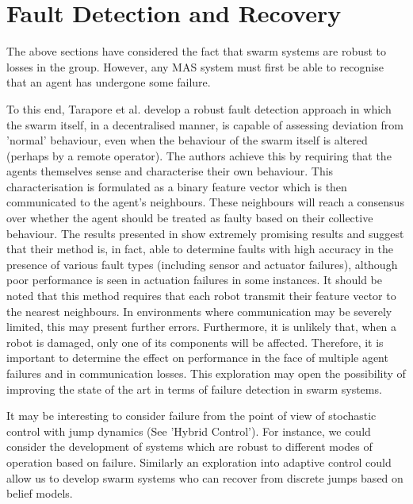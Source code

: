 \documentclass[../sample.tex]{subfiles}
\begin{document}
\section{Fault Detection and Recovery}


The above sections have considered the fact that swarm systems are robust to losses in the group. 
However, any MAS system must first be able to recognise that an agent has undergone some failure.

To this end, Tarapore et al. \cite{Tarapore2019FaultDetection} develop a robust fault detection
approach in which the swarm itself, in a decentralised manner, is capable of assessing deviation
from 'normal' behaviour, even when the behaviour of the swarm itself is altered (perhaps by a remote
operator). The authors achieve this by requiring that the agents themselves sense and characterise
their own behaviour. This characterisation is formulated as a binary feature vector which is then
communicated to the agent's neighbours. These neighbours will reach a consensus over whether the
agent should be treated as faulty based on their collective behaviour. The results presented in
\cite{Tarapore2019FaultDetection} show extremely promising results and suggest that their method is,
in fact, able to determine faults with high accuracy in the presence of various fault types
(including sensor and actuator failures), although poor performance is seen in actuation failures in
some instances. It should be noted that this method requires that each robot transmit their feature
vector to the nearest neighbours. In environments where communication may be severely limited, this
may present further errors. Furthermore, it is unlikely that, when a robot is damaged, only one of
its components will be affected. Therefore, it is important to determine the effect on performance
in the face of multiple agent failures and in communication losses. This exploration may open the
possibility of improving the state of the art in terms of failure detection in swarm systems. 

It may be interesting to consider failure from the point of view of stochastic control with
jump dynamics (See 'Hybrid Control'). For instance, we could consider the development of systems
which are robust to different modes of operation based on failure. Similarly an exploration into
adaptive control could allow us to develop swarm systems who can recover from discrete jumps based
on belief models.
\end{document}
